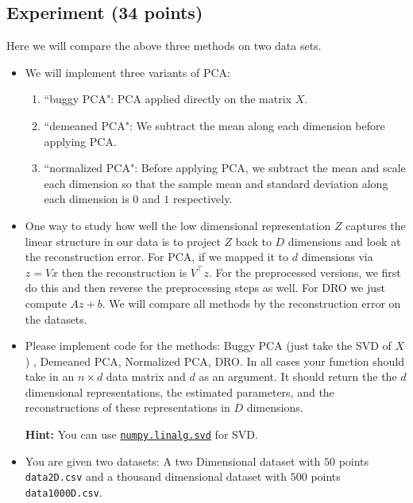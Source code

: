 \documentclass[letter]{article}
\theoremstyle{definition}
\begin{document}
\subsection{Experiment (34 points)}

Here we will compare the above three methods on two data sets. 

\begin{itemize}
\item We will implement three variants of PCA:
\begin{enumerate}
    \item ``buggy PCA": PCA applied directly on the matrix $X$.
    \item ``demeaned PCA": We subtract the mean along each dimension before applying PCA.
    \item ``normalized PCA": Before applying PCA, we subtract the mean and scale each dimension so that the sample  mean and standard deviation along each dimension is $0$ and $1$ respectively.
    
\end{enumerate}



\item 
One way to study how well the low dimensional representation $Z$ captures the linear
structure in our data is to project $Z$ back to $D$ dimensions and look at the reconstruction
error. For PCA, if we mapped it to $d$ dimensions via $z = Vx$ then the
reconstruction is $V^\top z$. For the preprocessed versions, we first do this and then
reverse the preprocessing steps as well. For DRO  we just compute $Az + b$.
We will compare all methods by the reconstruction error on the datasets.

\item 
Please implement code for the methods: Buggy PCA (just take the SVD of $X$)
, Demeaned PCA,
Normalized PCA, DRO. In all cases your function should take in
an $n \times d$ data matrix and $d$ as an argument. It should return the
the $d$ dimensional representations, the estimated parameters, and the
reconstructions of these representations in $D$ dimensions. 

\textbf{Hint: }You can use \href{https://numpy.org/doc/stable/reference/generated/numpy.linalg.svd.html}{\texttt{numpy.linalg.svd}} for SVD. 

\item
You are given two datasets: A two Dimensional dataset with $50$ points 
\texttt{data2D.csv} and a thousand dimensional dataset with $500$ points
\texttt{data1000D.csv}. 


\end{itemize}
\end{document}
